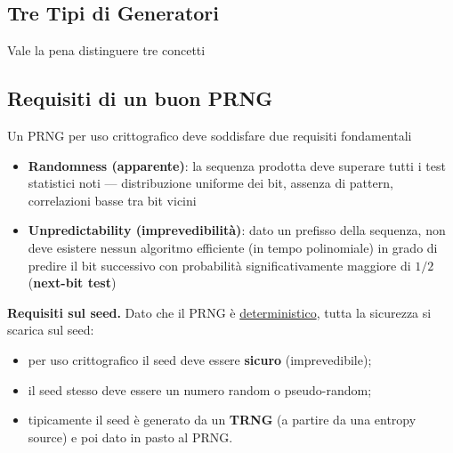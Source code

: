 \subsection{Tre Tipi di Generatori}
Vale la pena distinguere tre concetti

\subsection{Requisiti di un buon PRNG}
Un PRNG per uso crittografico deve soddisfare due requisiti fondamentali
\begin{itemize}
  \item \textbf{Randomness (apparente)}: la sequenza prodotta deve superare tutti i test statistici noti — distribuzione uniforme dei bit, assenza di pattern, correlazioni basse tra bit vicini
  \item \textbf{Unpredictability (imprevedibilità)}: dato un prefisso della sequenza, non deve esistere nessun algoritmo efficiente (in tempo polinomiale) in grado di predire il bit successivo con probabilità significativamente maggiore di $1/2$ (\textbf{next-bit test})
\end{itemize}

\textbf{Requisiti sul seed.} Dato che il PRNG è \underline{deterministico}, tutta la sicurezza si scarica sul seed:
\begin{itemize}
  \item per uso crittografico il seed deve essere \textbf{sicuro} (imprevedibile);
  \item il seed stesso deve essere un numero random o pseudo-random;
  \item tipicamente il seed è generato da un \textbf{TRNG} (a partire da una entropy source) e poi dato in pasto al PRNG.
\end{itemize}

